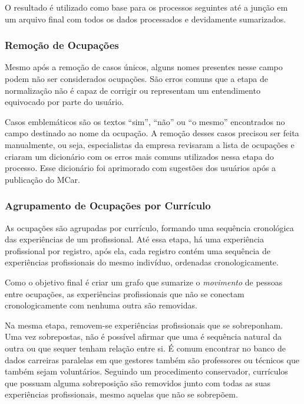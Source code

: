 \documentclass[12pt,a4paper]{article}
\begin{document}
O resultado é utilizado como base para os processos seguintes até a junção em um arquivo final com todos os dados processados e devidamente sumarizados.


\subsubsection{Remoção de Ocupações} \label{sec:remocao-ocupacoes-incorretas}

Mesmo após a remoção de casos únicos, alguns nomes presentes nesse campo podem não ser considerados ocupações. São erros comuns que a etapa de normalização não é capaz de corrigir ou representam um entendimento equivocado por parte do usuário.

Casos emblemáticos são os textos \enquote{sim}, \enquote{não} ou \enquote{o mesmo} encontrados no campo destinado ao nome da ocupação. A remoção desses casos precisou ser feita manualmente, ou seja, especialistas da empresa revisaram a lista de ocupações e criaram um dicionário com os erros mais comuns utilizados nessa etapa do processo. Esse dicionário foi aprimorado com sugestões dos usuários após a publicação do MCar.


\subsubsection{Agrupamento de Ocupações por Currículo} \label{sec:agrupamento-por-curriculo}

As ocupações são agrupadas por currículo, formando uma sequência cronológica das experiências de um profissional. Até essa etapa, há uma experiência profissional por registro, após ela, cada registro contém uma sequência de experiências profissionais do mesmo indivíduo, ordenadas cronologicamente.

Como o objetivo final é criar um grafo que sumarize o \textit{movimento} de pessoas entre ocupações, as experiências profissionais que não se conectam cronologicamente com nenhuma outra são removidas.

Na mesma etapa, removem-se experiências profissionais que se sobreponham. Uma vez sobrepostas, não é possível afirmar que uma é sequência natural da outra ou que sequer tenham relação entre si. É comum encontrar no banco de dados carreiras paralelas em que gestores também são professores ou técnicos que também sejam voluntários. Seguindo um procedimento conservador, currículos que possuam alguma sobreposição são removidos junto com todas as suas experiências profissionais, mesmo aquelas que não se sobrepõem.
    
\end{document}
